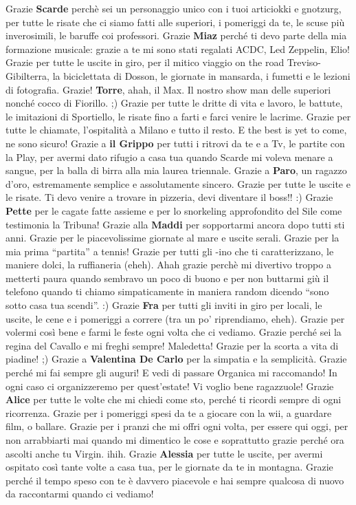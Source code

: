 \documentclass[10pt]{amsart}
\newcommand{\n}[1]{{\Large \bf #1}}
\begin{document}
 Grazie \n{Scarde} perchè sei un personaggio unico con i tuoi articiokki e gnotzurg, per tutte le risate che ci siamo fatti alle superiori, i pomeriggi da te, le scuse più inverosimili, le baruffe coi professori. Grazie \n{Miaz} perché ti devo parte della mia formazione musicale: grazie a te mi sono stati regalati ACDC, Led Zeppelin, Elio! Grazie per tutte le uscite in giro, per il mitico viaggio on the road Treviso-Gibilterra, la biciclettata di Dosson, le giornate in mansarda, i fumetti e le lezioni di fotografia. Grazie! \n{Torre}, ahah, il Max. Il nostro show man delle superiori nonché cocco di Fiorillo. ;) Grazie per tutte le dritte di vita e lavoro, le battute, le imitazioni di Sportiello, le risate fino a farti e farci venire le lacrime. Grazie per tutte le chiamate, l'ospitalità a Milano e tutto il resto. E the best is yet to come, ne sono sicuro! Grazie a \n{il Grippo} per tutti i ritrovi da te e a Tv, le partite con la Play, per avermi dato rifugio a casa tua quando Scarde mi voleva menare a sangue, per la balla di birra alla mia laurea triennale. Grazie a \n{Paro}, un ragazzo d'oro, estremamente semplice e assolutamente sincero. Grazie per tutte le uscite e le risate. Ti devo venire a trovare in pizzeria, devi diventare il boss!! :) Grazie \n{Pette} per le cagate fatte assieme e per lo snorkeling approfondito del Sile come testimonia la Tribuna! Grazie alla \n{Maddi} per sopportarmi ancora dopo tutti sti anni. Grazie per le piacevolissime giornate al mare e uscite serali. Grazie per la mia prima ``partita'' a tennis! Grazie per tutti gli -ino che ti caratterizzano, le maniere dolci, la ruffianeria (eheh). Ahah grazie perchè mi divertivo troppo a metterti paura quando sembravo un poco di buono e per non buttarmi giù il telefono quando ti chiamo simpaticamente in maniera random dicendo ``sono sotto casa tua scendi''. :) Grazie \n{Fra} per tutti gli inviti in giro per locali, le uscite, le cene e i pomeriggi a correre (tra un po' riprendiamo, eheh). Grazie per volermi così bene e farmi le feste ogni volta che ci vediamo. Grazie perché sei la regina del Cavallo e mi freghi sempre! Maledetta! Grazie per la scorta a vita di piadine! ;) Grazie a \n{Valentina De Carlo} per la simpatia e la semplicità. Grazie perché mi fai sempre gli auguri! E vedi di passare Organica mi raccomando! In ogni caso ci organizzeremo per quest'estate! Vi voglio bene ragazzuole!
Grazie \n{Alice} per tutte le volte che mi chiedi come sto, perché ti ricordi sempre di ogni ricorrenza. Grazie per i pomeriggi spesi da te a giocare con la wii, a guardare film, o ballare. Grazie per i pranzi che mi offri ogni volta, per essere qui oggi, per non arrabbiarti mai quando mi dimentico le cose e soprattutto grazie perché ora ascolti anche tu Virgin. ihih.
Grazie \n{Alessia} per tutte le uscite, per avermi ospitato così tante volte a casa tua, per le giornate da te in montagna. Grazie perché il tempo speso con te è davvero piacevole e hai sempre qualcosa di nuovo da raccontarmi quando ci vediamo!\\
\end{document}
